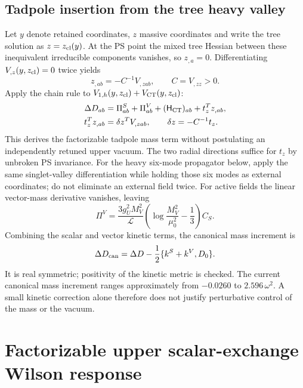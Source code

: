 \documentclass[11pt]{article}
\newcommand{\LOOP}{\mathcal L}
\begin{document}
\subsection{Tadpole insertion from the tree heavy valley}
Let $y$ denote retained coordinates, $z$ massive coordinates and write
the tree solution as $z=z_{\rm cl}(y)$. At the PS point the mixed tree
Hessian between these inequivalent irreducible components vanishes, so
$z_{,a}=0$. Differentiating $V_{,z}(y,z_{\rm cl})=0$ twice yields
\begin{equation}
 z_{,ab}=-C^{-1}V_{,zab},\qquad C=V_{,zz}>0.
\end{equation}
Apply the chain rule to $V_{1,h}(y,z_{\rm cl})+V_{\rm CT}(y,z_{\rm cl})$:
\begin{align}
 \Delta D_{ab}&=\Pi_{ab}^{S}+\Pi_{ab}^{V}
       +(\mathsf H_{\rm CT})_{ab}+t_z^T z_{,ab},\\
 t_z^Tz_{,ab}&=\delta z^TV_{,zab},\qquad \delta z=-C^{-1}t_z.
 \label{eq:valley-mass}
\end{align}
This derives the factorizable tadpole mass term without postulating an
independently retuned upper vacuum. The two radial directions suffice
for $t_z$ by unbroken PS invariance. For the heavy six-mode propagator
below, apply the same singlet-valley differentiation while holding those
six modes as external coordinates; do not eliminate an external field
twice.
For active fields the linear vector-mass derivative vanishes, leaving
\begin{equation}
 \Pi^V=\frac{3g_U^2M_V^2}{\LOOP}
 \left(\log\frac{M_V^2}{\mu_0^2}-\frac13\right)C_S.
\end{equation}
Combining the scalar and vector kinetic terms, the canonical mass
increment is
\begin{equation}
 \Delta D_{\rm can}=\Delta D-\frac12\{k^S+k^V,D_0\}.
\end{equation}
It is real symmetric; positivity of the kinetic metric is checked.
The current canonical mass increment ranges approximately from
$-0.0260$ to $2.596\,\omega^2$. A small kinetic correction alone therefore
does not justify perturbative control of the mass or the vacuum.

\section{Factorizable upper scalar-exchange Wilson response}
\end{document}

